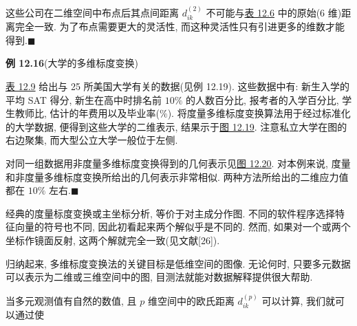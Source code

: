 
这些公司在二维空间中布点后其点间距离 $d_{ik}^{(2)}$ 不可能与\hyperref[tab:12.6]{表 12.6} 中的原始(6 维)距离完全一致. 为了布点需要更大的灵活性, 而这种灵活性只有引进更多的维数才能得到.\hfill$\blacksquare$

\noindent\textbf{例 12.16}\quad (大学的多维标度变换)

\hyperref[tab:12.9]{表 12.9} 给出与 25 所美国大学有关的数据(见例 12.19). 这些数据中有: 新生入学的平均 SAT 得分, 新生在高中时排名前 $10\%$ 的人数百分比, 报考者的入学百分比, 学生教师比, 估计的年费用以及毕业率($\%$). 将度量多维标度变换算法用于经过标准化的大学数据, 便得到这些大学的二维表示, 结果示于\hyperref[fig:12.19]{图 12.19}. 注意私立大学在图的右边聚集, 而大型公立大学一般位于左侧.

\begin{mvfigure}
\label{fig:12.19}
\end{mvfigure}

对同一组数据用非度量多维标度变换得到的几何表示见\hyperref[fig:12.20]{图 12.20}. 对本例来说, 度量和非度量多维标度变换所给出的几何表示非常相似. 两种方法所给出的二维应力值都在 $10\%$ 左右.\hfill$\blacksquare$

经典的度量标度变换或主坐标分析, 等价于对主成分作图. 不同的软件程序选择特征向量的符号也不同, 因此初看起来两个解似乎是不同的. 然而, 如果对一个或两个坐标作镜面反射, 这两个解就完全一致(见文献[26]).

归纳起来, 多维标度变换法的关键目标是低维空间的图像. 无论何时, 只要多元数据可以表示为二维或三维空间中的图, 目测法就能对数据解释提供很大帮助.

当多元观测值有自然的数值, 且 $p$ 维空间中的欧氏距离 $d_{ik}^{(p)}$ 可以计算, 我们就可以通过使
